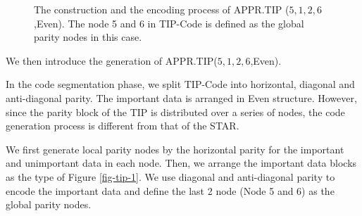 \documentclass[sigconf]{acmart}
\begin{document}
\begin{figure}[ht]
\caption{The construction and the encoding process of APPR.TIP ($5,1,2,6$,Even). The node 5 and 6 in TIP-Code is defined as the global parity nodes in this case.}
\label{fig-ap-TIP}
\end{figure}

We then introduce the generation of APPR.TIP($5,1,2,6$,Even).

In the code segmentation phase, we split TIP-Code into horizontal, diagonal and anti-diagonal parity. The important data is arranged in Even structure. However, since the parity block of the TIP is distributed over a series of nodes, the code generation process is different from that of the STAR.

We first generate local parity nodes by the horizontal parity for the important and unimportant data in each node. Then, we arrange the important data blocks as the type of Figure \ref{fig-tip-1}.
We use diagonal and anti-diagonal parity to encode the important data and define the last 2 node (Node 5 and 6) as the global parity nodes.
\end{document}
